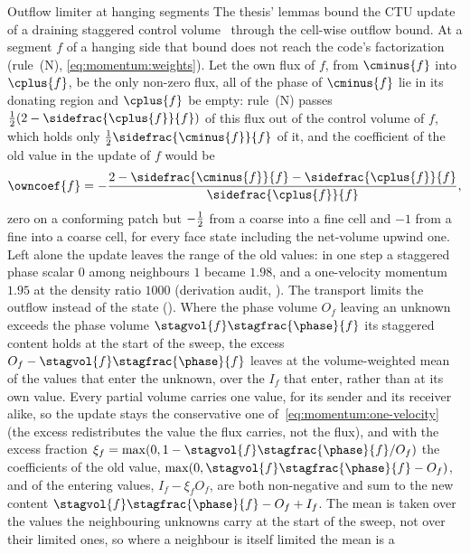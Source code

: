 \begin{deviation}{Outflow limiter at hanging segments}\label{dev:momentum:ctu-hanging}
The thesis' lemmas bound the CTU update of a draining staggered control
volume~ through the cell-wise outflow bound. At a
segment $f$ of a hanging side that bound does not reach the code's
factorization (rule~(N), \cref{eq:momentum:weights}). Let the own flux of
$f$, from $\cminus{f}$ into $\cplus{f}$, be the only non-zero flux, all of
the phase of $\cminus{f}$ lie in its donating region and $\cplus{f}$ be
empty: rule~(N) passes $\half(2-\sidefrac{\cplus{f}}{f})$ of this flux out
of the control volume of $f$, which holds only
$\half\sidefrac{\cminus{f}}{f}$ of it, and the coefficient of the old value
in the update of $f$ would be
\begin{equation}\label{eq:momentum:own-coefficient}
  \owncoef{f}=-\frac{2-\sidefrac{\cminus{f}}{f}-\sidefrac{\cplus{f}}{f}}{\sidefrac{\cplus{f}}{f}},
\end{equation}
zero on a conforming patch but $-\frac{1}{2}$ from a coarse into a fine cell and
$-1$ from a fine into a coarse cell, for every face state including the
net-volume upwind one. Left alone the update leaves the range of the old
values: in one step a staggered phase scalar $0$ among neighbours $1$ became
$1.98$, and a one-velocity momentum $1.95$ at the density ratio $1000$
(derivation audit, ).
The transport limits the outflow instead of the state
(). Where
the phase volume $O_f$ leaving an unknown exceeds the phase volume
$\stagvol{f}\stagfrac{\phase}{f}$ its staggered content holds at the start
of the sweep, the excess $O_f-\stagvol{f}\stagfrac{\phase}{f}$ leaves at
the volume-weighted mean of the values that enter the unknown, over the
$I_f$ that enter, rather than at its own value. Every partial volume carries one value, for its
sender and its receiver alike, so the update stays the conservative one
of~\cref{eq:momentum:one-velocity} (the excess redistributes the value the
flux carries, not the flux), and with the excess fraction
$\xi_f=\max(0,1-\stagvol{f}\stagfrac{\phase}{f}/O_f)$ the coefficients of
the old value, $\max(0,\stagvol{f}\stagfrac{\phase}{f}-O_f)$, and of the
entering values, $I_f-\xi_f O_f$, are both non-negative and sum to the new
content $\stagvol{f}\stagfrac{\phase}{f}-O_f+I_f$. The mean is taken over the
values the neighbouring unknowns carry at the start of the sweep, not over
their limited ones, so where a neighbour is itself limited the mean is a

\end{deviation}
